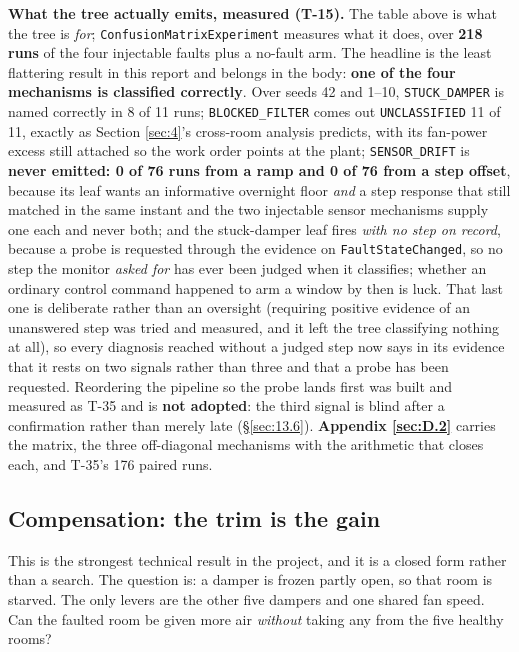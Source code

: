 \textbf{What the tree actually emits, measured (T-15).} The table above is what the tree is
\emph{for}; \texttt{ConfusionMatrixExperiment} measures what it does, over \textbf{218 runs} of the
four injectable faults plus a no-fault arm. The headline is the least flattering result in this report
and belongs in the body: \textbf{one of the four mechanisms is classified correctly}. Over seeds 42
and 1--10, \texttt{STUCK\_DAMPER} is named correctly in 8 of 11 runs; \texttt{BLOCKED\_FILTER} comes
out \texttt{UNCLASSIFIED} 11 of 11, exactly as Section \ref{sec:4}'s cross-room analysis predicts, with its
fan-power excess still attached so the work order points at the plant; \texttt{SENSOR\_DRIFT} is
\textbf{never emitted: 0 of 76 runs from a ramp and 0 of 76 from a step offset}, because its leaf
wants an informative overnight floor \emph{and} a step response that still matched in the same
instant and the two injectable sensor mechanisms supply one each and never both; and the stuck-damper
leaf fires \emph{with no step on record}, because a probe is requested through the evidence on
\texttt{FaultStateChanged}, so no step the monitor \emph{asked for} has ever been judged when it
classifies; whether an ordinary control command happened to arm a window by then is luck. That
last one is deliberate rather than an oversight (requiring positive evidence of an unanswered step
was tried and measured, and it left the tree classifying nothing at all), so every diagnosis reached
without a judged step now says in its evidence that it rests on two signals rather than three and that
a probe has been requested. Reordering the pipeline so the probe lands first was built and measured as
T-35 and is \textbf{not adopted}: the third signal is blind after a confirmation rather than merely
late (§\ref{sec:13.6}). \textbf{Appendix \ref{sec:D.2}} carries the matrix, the three off-diagonal mechanisms with the
arithmetic that closes each, and T-35's 176 paired runs.

\subsection{Compensation: the trim is the gain}\label{sec:7.4}

This is the strongest technical result in the project, and it is a closed form rather than a
search. The question is: a damper is frozen partly open, so that room is starved. The only levers
are the other five dampers and one shared fan speed. Can the faulted room be given more air
\emph{without} taking any from the five healthy rooms?

